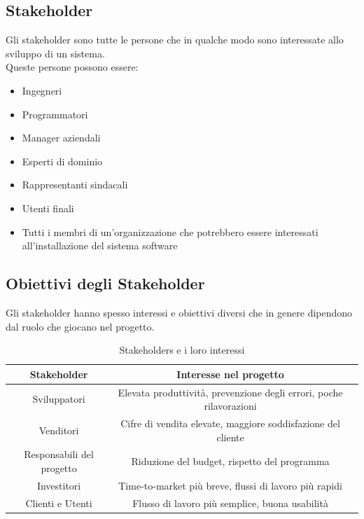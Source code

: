 \documentclass{article}
\begin{document}
	\subsection{Stakeholder}
	Gli stakeholder sono tutte le persone che in qualche modo sono interessate allo sviluppo di un sistema.\\
	Queste persone possono essere:
	\begin{itemize}
		\item Ingegneri
		\item Programmatori
		\item Manager aziendali
		\item Esperti di dominio
		\item Rappresentanti sindacali
		\item Utenti finali
		\item Tutti i membri di un'organizzazione che potrebbero essere interessati all'installazione del sistema software
	\end{itemize}
	\subsection{Obiettivi degli Stakeholder}
	Gli stakeholder hanno spesso interessi e obiettivi diversi che in genere dipendono dal ruolo che giocano nel progetto.\\
	\begin{table}[h!]
		\centering
		\begin{tabular}{ |c|c|c| } 
			\hline
			\textbf{Stakeholder} & \textbf{Interesse nel progetto}\\
			\hline
			Sviluppatori & Elevata produttività, prevenzione degli errori,
			poche rilavorazioni\\
			\hline
			Venditori & Cifre di vendita elevate, maggiore soddisfazione del cliente\\
			\hline
			Responsabili del progetto & Riduzione del budget, rispetto del programma\\
			\hline
			Investitori & Time-to-market più breve, flussi di lavoro più rapidi\\
			\hline
			Clienti e Utenti & Flusso di lavoro più semplice, buona usabilità\\
			\hline
		\end{tabular}
		\caption{Stakeholders e i loro interessi}
	\end{table}
\end{document}
